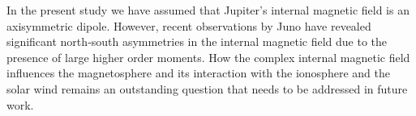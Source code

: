 In the present study we have assumed that Jupiter's internal magnetic field is an axisymmetric dipole. However, recent observations by Juno have revealed significant north‐south asymmetries in the internal magnetic field \cite{Connerney2018} due to the presence of large higher order moments. How the complex internal magnetic field influences the magnetosphere and its interaction with the ionosphere and the solar wind remains an outstanding question that needs to be addressed in future work. 